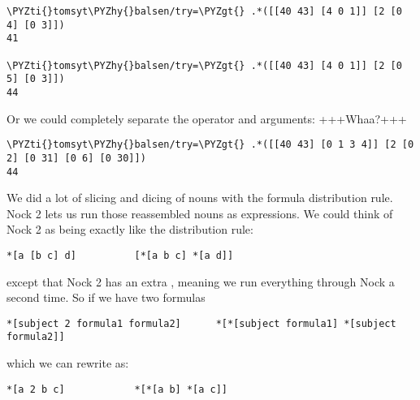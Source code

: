 \begin{framed_shaded}
\begin{Verbatim}[fontsize=\relsize{-2.5},commandchars=\\\{\}]
\PYZti{}tomsyt\PYZhy{}balsen/try=\PYZgt{} .*([[40 43] [4 0 1]] [2 [0 4] [0 3]])
41

\PYZti{}tomsyt\PYZhy{}balsen/try=\PYZgt{} .*([[40 43] [4 0 1]] [2 [0 5] [0 3]])
44
\end{Verbatim}
\end{framed_shaded}
Or we could completely separate the operator and arguments: +++Whaa?+++

\begin{framed_shaded}
\begin{Verbatim}[fontsize=\relsize{-2.5},commandchars=\\\{\}]
\PYZti{}tomsyt\PYZhy{}balsen/try=\PYZgt{} .*([[40 43] [0 1 3 4]] [2 [0 2] [0 31] [0 6] [0 30]])
44
\end{Verbatim}
\end{framed_shaded}
We did a lot of slicing and dicing of nouns with the formula distribution rule.
Nock 2 lets us run those reassembled nouns as expressions. We could think of
Nock 2 as being exactly like the distribution rule:

\begin{framed_shaded}
\begin{Verbatim}[fontsize=\relsize{-2.5},commandchars=\\\{\}]
*[a [b c] d]          [*[a b c] *[a d]]
\end{Verbatim}
\end{framed_shaded}
except that Nock 2 has an extra \kode{*}, meaning we run everything through Nock a
second time. So if we have two formulas

\begin{framed_shaded}
\begin{Verbatim}[fontsize=\relsize{-2.5},commandchars=\\\{\}]
*[subject 2 formula1 formula2]      *[*[subject formula1] *[subject formula2]]
\end{Verbatim}
\end{framed_shaded}
which we can rewrite as:

\begin{framed_shaded}
\begin{Verbatim}[fontsize=\relsize{-2.5},commandchars=\\\{\}]
*[a 2 b c]            *[*[a b] *[a c]]
\end{Verbatim}
\end{framed_shaded}

